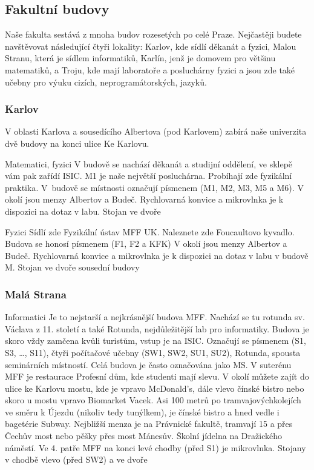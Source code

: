 \subsection{Fakultní budovy}
Naše fakulta sestává z mnoha budov rozesetých po celé Praze. Nejčastěji budete
navštěvovat následující čtyři lokality: Karlov, kde sídlí děkanát a fyzici,
Malou Stranu, která je sídlem informatiků, Karlín, jenž je domovem pro většinu
matematiků, a Troju, kde mají laboratoře a posluchárny fyzici a jsou zde také
učebny pro výuku cizích, neprogramátorských, jazyků.


\subsubsection{Karlov}
V oblasti Karlova a sousedícího Albertova (pod Karlovem) zabírá naše univerzita
dvě budovy na konci ulice Ke Karlovu.

{Matematici, fyzici}
{V budově se nachází děkanát a studijní oddělení, ve sklepě vám pak zařídí ISIC.
M1 je naše největší posluchárna. Probíhají zde fyzikální praktika.}
{V~budově se místnosti označují písmenem  (M1, M2, M3, M5 a M6).}
{V okolí jsou menzy Albertov a Budeč. Rychlovarná konvice a mikrovlnka je k
dispozici na dotaz v labu.}
{Stojan ve dvoře}

{Fyzici}
{Sídlí zde Fyzikální ústav MFF UK. Naleznete zde Foucaultovo kyvadlo.}
{Budova se honosí písmenem  (F1, F2 a KFK)}
{V okolí jsou menzy Albertov a Budeč. Rychlovarná konvice a mikrovlnka je k
dispozici na dotaz v labu v budově M.}
{Stojan ve dvoře sousední budovy}

\subsubsection{Malá Strana}

{Informatici}
{Je to nejstarší a nejkrásnější budova MFF. Nachází se tu rotunda sv. Václava z
11. století a také Rotunda, nejdůležitější lab pro informatiky. Budova je skoro
vždy zamčena kvůli turistům, vstup je na ISIC.}
{Označují se písmenem  (S1, S3, \dots, S11), čtyři počítačové učebny (SW1,
SW2, SU1, SU2), Rotunda, spousta seminárních místností. Celá budova je často
označována jako MS.}
{
    V suterénu MFF je restaurace Profesní dům, kde studenti mají slevu.
    V okolí můžete zajít do ulice ke Karlovu mostu, kde je vpravo McDonald's,
        dále vlevo čínské bistro nebo skoro u mostu vpravo Biomarket Vacek.
    Asi 100 metrů po tramvajovýchkolejích ve směru k Újezdu (nikoliv tedy tunýlkem),
        je čínské bistro a hned vedle i bagetérie Subway.
    Nejbližší menza je na Právnické fakultě, tramvají 15 a přes Čechův most nebo
        pěšky přes most Mánesův.
    Školní jídelna na Dražického náměstí.
    Ve 4. patře MFF na konci levé chodby (před S1) je mikrovlnka.
}
{Stojany v chodbě vlevo (před SW2) a ve dvoře}



